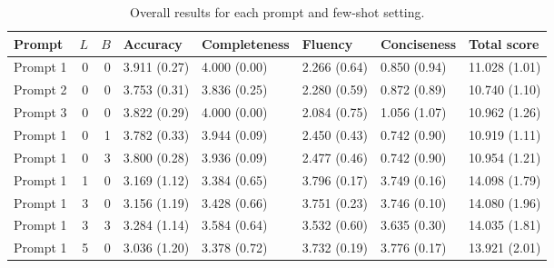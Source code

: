\begin{table}
\caption{Overall results for each prompt and few-shot setting.}
\begin{tabular}{lrrlllll}
\toprule
Prompt & $L$ & $B$ & Accuracy & Completeness & Fluency & Conciseness & Total score \\
\midrule
Prompt 1 & 0 & 0 & 3.911 (0.27) & 4.000 (0.00) & 2.266 (0.64) & 0.850 (0.94) & 11.028 (1.01) \\
Prompt 2 & 0 & 0 & 3.753 (0.31) & 3.836 (0.25) & 2.280 (0.59) & 0.872 (0.89) & 10.740 (1.10) \\
Prompt 3 & 0 & 0 & 3.822 (0.29) & 4.000 (0.00) & 2.084 (0.75) & 1.056 (1.07) & 10.962 (1.26) \\
Prompt 1 & 0 & 1 & 3.782 (0.33) & 3.944 (0.09) & 2.450 (0.43) & 0.742 (0.90) & 10.919 (1.11) \\
Prompt 1 & 0 & 3 & 3.800 (0.28) & 3.936 (0.09) & 2.477 (0.46) & 0.742 (0.90) & 10.954 (1.21) \\
Prompt 1 & 1 & 0 & 3.169 (1.12) & 3.384 (0.65) & 3.796 (0.17) & 3.749 (0.16) & 14.098 (1.79) \\
Prompt 1 & 3 & 0 & 3.156 (1.19) & 3.428 (0.66) & 3.751 (0.23) & 3.746 (0.10) & 14.080 (1.96) \\
Prompt 1 & 3 & 3 & 3.284 (1.14) & 3.584 (0.64) & 3.532 (0.60) & 3.635 (0.30) & 14.035 (1.81) \\
Prompt 1 & 5 & 0 & 3.036 (1.20) & 3.378 (0.72) & 3.732 (0.19) & 3.776 (0.17) & 13.921 (2.01) \\
\bottomrule
\end{tabular}
\end{table}

